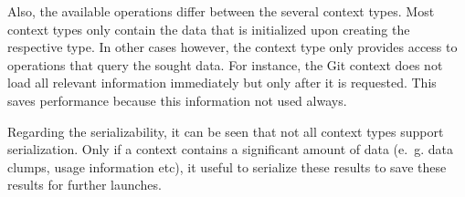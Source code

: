 Also, the available operations differ between  the several context types. Most context types only contain the data that is initialized upon creating the respective type. In other cases however, the context type only provides access to operations that query the sought data. For instance, the Git context does not load all relevant information immediately but only after it is requested. This saves performance because this information not used always. 

Regarding the serializability, it can be seen that not all context types support serialization. Only if a context contains a significant amount of data (e.~g. data clumps, usage information etc), it useful to serialize these results to save these results for further launches. 
